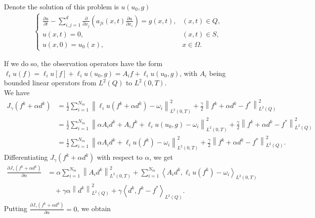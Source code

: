 \documentclass[]{article}
\begin{document}
\begin{bt}\label{bt2.2}
	Denote the solution of this problem is $u(u_0, g)$
	\begin{align*}
		\begin{cases}
			\frac{\partial u}{\partial t}-\sum_{i, j=1}^{d}\frac{\partial}{\partial x_j}\left(a_{ji}(x, t)\frac{\partial u}{\partial x_i}\right)=g(x, t),&(x, t)\in Q,\\
			u(x, t)=0, & (x, t)\in S,\\
			u(x, 0)=u_0(x),&x\in \Omega.
		\end{cases}
	\end{align*}
\end{bt}
\noindent If we do so, the observation operators have the form $\ell_i u(f)=\ell_i u[f]+\ell_i u(u_0, g)=A_if+\ell_i u(u_0, g)$, with $A_i$ being bounded linear operators from $L^2(Q)$ to $L^2(0, T)$.\\
We have
\begin{align*}
	J_{\gamma}(f^k+\alpha d^k)&=\frac{1}{2}\sum_{i=1}^{N_m}\left\|\ell_i u(f^k+\alpha d^k)-\omega_i\right\|_{L^2(0, T)}^2+\frac{\gamma}{2}\left\|f^k+\alpha d^k-f^*\right\|_{L^2(Q)}^2\\[0.2cm]
	&=\frac{1}{2}\sum_{i=1}^{N_m}\left\|\alpha A_id^k+A_if^k+\ell_i u(u_0, g)-\omega_i\right\|_{L^2(0, T)}^2+\frac{\gamma}{2}\left\|f^k+\alpha d^k-f^*\right\|_{L^2(Q)}^2\\[0.2cm]
	&=\frac{1}{2}\sum_{i=1}^{N_m}\left\|\alpha A_id^k+\ell_i u(f^k)-\omega_i\right\|_{L^2(0, T)}^2+\frac{\gamma}{2}\left\|f^k+\alpha d^k-f^*\right\|_{L^2(Q)}^2.
\end{align*}
Differentiating $J_\gamma(f^k+\alpha d^k)$ with respect to $\alpha$, we get
\begin{align*}
	\frac{\partial J_\gamma(f^k+\alpha d^k)}{\partial \alpha} &= \alpha\sum_{i=1}^{N_m}\left\|A_id^k \right\|_{L^2(0, T)}^2+\sum_{i=1}^{N_m}\left\langle A_id^k,\ell_i u(f^k)-\omega_i\right\rangle_{L^2(0, T)}\\[0.2cm]
	&\quad+\gamma\alpha\left\| d^k\right\|_{L^2(Q)}^2+\gamma\left\langle d^k, f^k-f^*\right\rangle_{L^2(Q)}.
\end{align*}
Putting $\frac{\partial J_\gamma(f^k+\alpha d^k)}{\partial \alpha}=0$, we obtain
\end{document}
